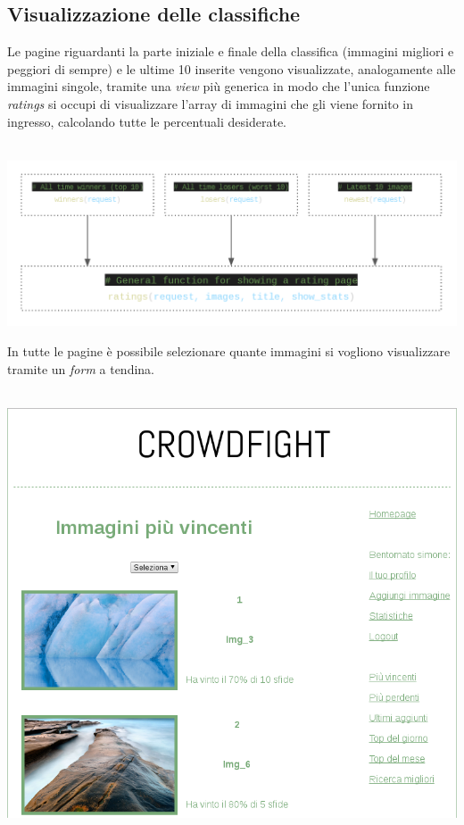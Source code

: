 \documentclass{scrreprt}
\begin{document}
\subsection{Visualizzazione delle classifiche}
Le pagine riguardanti la parte iniziale e finale della classifica (immagini migliori e peggiori di sempre) e le ultime 10 inserite vengono visualizzate, analogamente alle immagini singole, tramite una \textit{view} più generica in modo che l'unica funzione \textit{ratings} si occupi di visualizzare l'array di immagini che gli viene fornito in ingresso, calcolando tutte le percentuali desiderate.\\\\
\centerline{\includegraphics[scale=0.33]{schemeratings}}
In tutte le pagine è possibile selezionare quante immagini si vogliono visualizzare tramite un \textit{form} a tendina.\\\\
\centerline{\includegraphics[scale=0.38]{ratings}}
\pagebreak
\end{document}
